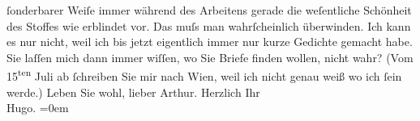 \begin{ledgroupsized}[t]{13cm}
               ſonderbarer Weiſe immer während des Arbeitens gerade die weſentliche Schönheit des
               Stoffes wie erblindet vor. Das muſs man wahrſcheinlich überwinden. Ich kann es nur
               nicht, weil ich bis jetzt eigentlich immer nur {\pb}kurze Gedichte gemacht habe.\pend
           \pstart
           Sie laſſen mich dann immer wiſſen, wo Sie Briefe finden wollen, nicht wahr? (Vom
                     15\textsuperscript{ten} Juli ab ſchreiben Sie mir nach
                  Wien, weil ich nicht genau weiß wo ich ſein
               werde.) Leben Sie wohl, lieber Arthur.\pend
           \pstart
           Herzlich Ihr{\\[\baselineskip]}\spacefill\mbox{Hugo.}\pend
           \leftskip=0em{}
         
         \endnumbering{}\end{ledgroupsized}  \newcommand{\dateiname}{L00556}\newcommand{\titel}{Hugo von Hofmannsthal an Arthur Schnitzler, 27. 6. [1896]}\newcommand{\editorInnen}{Martin Anton Müller und Gerd-Hermann Susen}
      